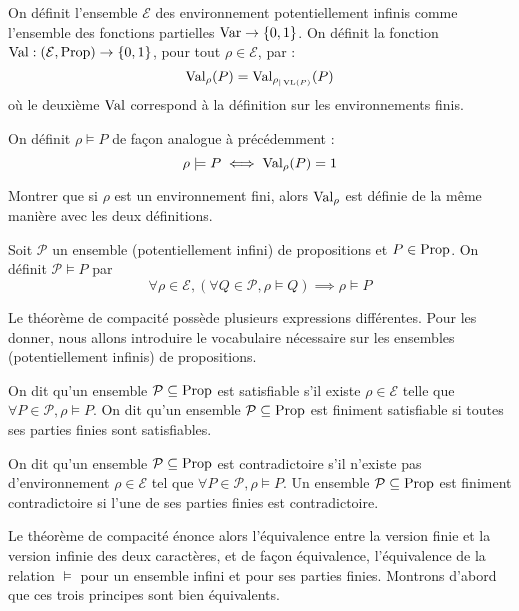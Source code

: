 \begin{definition}
  On définit l'ensemble $\mathcal E$ des environnement potentiellement infinis
  comme l'ensemble des fonctions partielles $\operatorname{Var} \to \{0,1\}$. On définit la
  fonction $\operatorname{Val} : (\mathcal E,\operatorname{Prop})\to \{0,1\}$, pour tout $\rho\in\mathcal E$,
  par :
  \[\operatorname{Val}_\rho(P) = \operatorname{Val}_{\rho_{|\operatorname{VL}(P)}}(P)\]
  où le deuxième $\operatorname{Val}$ correspond à la définition sur les environnements finis.

  On définit $\rho\models P$ de façon analogue à précédemment :
  \[\rho\models P \iff \operatorname{Val}_\rho(P) = 1\]
\end{definition}

\begin{exercise}
  Montrer que si $\rho$ est un environnement fini, alors $\operatorname{Val}_\rho$ est définie
  de la même manière avec les deux définitions.
\end{exercise}

\begin{definition}
  Soit $\mathcal P$ un ensemble (potentiellement infini) de propositions et
  $P\in\operatorname{Prop}$. On définit $\mathcal P\vDash P$ par
  \[\forall \rho\in\mathcal E, (\forall Q \in\mathcal P, \rho\models Q)
  \implies \rho\models P\]
\end{definition}

Le théorème de compacité possède plusieurs expressions différentes. Pour les
donner, nous allons introduire le vocabulaire nécessaire sur les ensembles
(potentiellement infinis) de propositions.

\begin{definition}[Satisfiabilité]
  On dit qu'un ensemble $\mathcal P\subseteq\operatorname{Prop}$ est satisfiable s'il existe
  $\rho\in\mathcal E$ telle que $\forall P\in\mathcal P, \rho\models P$. On dit
  qu'un ensemble $\mathcal P\subseteq\operatorname{Prop}$ est finiment satisfiable si toutes
  ses parties finies sont satisfiables.
\end{definition}

\begin{definition}[Contradiction]
  On dit qu'un ensemble $\mathcal P\subseteq\operatorname{Prop}$ est contradictoire s'il
  n'existe pas d'environnement $\rho\in\mathcal E$ tel que
  $\forall P \in\mathcal P, \rho\models P$. Un ensemble
  $\mathcal P\subseteq \operatorname{Prop}$ est finiment contradictoire si l'une de ses parties
  finies est contradictoire.
\end{definition}

Le théorème de compacité énonce alors l'équivalence entre la version finie et la
version infinie des deux caractères, et de façon équivalence, l'équivalence de
la relation $\vDash$ pour un ensemble infini et pour ses parties finies. Montrons
d'abord que ces trois principes sont bien équivalents.

